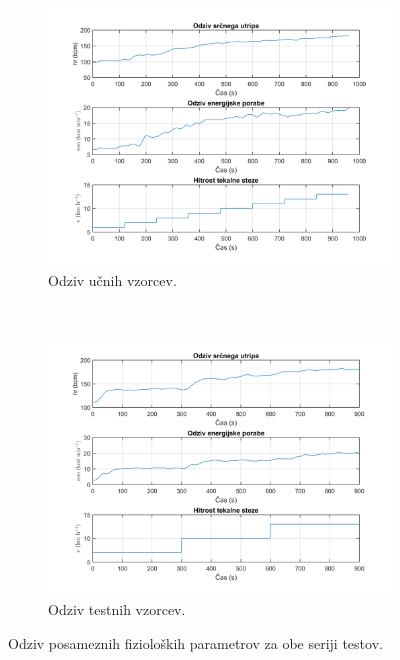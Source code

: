 \begin{figure}[htb]
	\centering
	\begin{subfigure}[t]{0.45\columnwidth}
		\includegraphics[width=\columnwidth]{./Slike/odziv-train.png}
		\caption{Odziv učnih vzorcev.}
		\label{fig:odziv-ucnih-stage1}
	\end{subfigure}
	~
	\begin{subfigure}[t]{0.45\columnwidth}
		\includegraphics[width=\columnwidth]{./Slike/odziv-test.png}
		\caption{Odziv testnih vzorcev.}
		\label{fig:odziv-testnih-stage1}
	\end{subfigure}
	\caption{Odziv posameznih fizioloških parametrov za obe seriji testov.}
	\label{fig:odziv-stage1}
\end{figure} 


